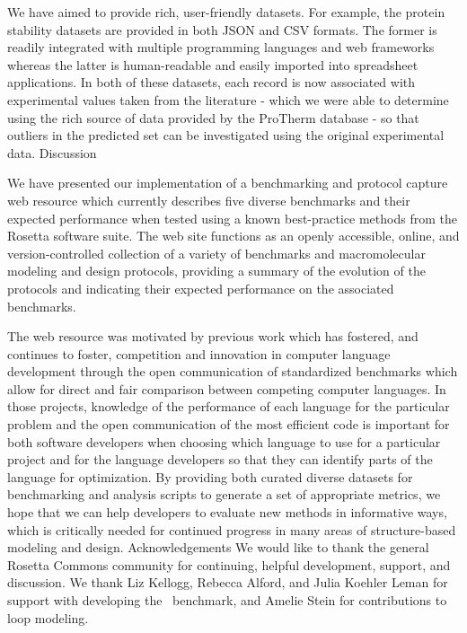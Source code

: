 We have aimed to provide rich, user-friendly datasets. For example, the protein stability datasets are provided in both JSON and CSV formats. The former is readily integrated with multiple programming languages and web frameworks whereas the latter is human-readable and easily imported into spreadsheet applications. In both of these datasets, each record is now associated with experimental values taken from the literature - which we were able to determine using the rich source of data provided by the ProTherm database \cite{kumar_protherm_2006} - so that outliers in the predicted set can be investigated using the original experimental data.
Discussion

We have presented our implementation of a benchmarking and protocol capture web resource which currently describes five diverse benchmarks and their expected performance when tested using a known best-practice methods from the Rosetta software suite. The web site functions as an openly accessible, online, and version-controlled collection of a variety of benchmarks and macromolecular modeling and design protocols, providing a summary of the evolution of the protocols and indicating their expected performance on the associated benchmarks.

The web resource was motivated by previous work \cite{bagley_d_computer_2004,calpini_a_great_2003} which has fostered, and continues to foster, competition and innovation in computer language development through the open communication of standardized benchmarks which allow for direct and fair comparison between competing computer languages. In those projects, knowledge of the performance of each language for the particular problem and the open communication of the most efficient code is important for both software developers when choosing which language to use for a particular project and for the language developers so that they can identify parts of the language for optimization. By providing both curated diverse datasets for benchmarking and analysis scripts to generate a set of appropriate metrics, we hope that we can help developers to evaluate new methods in informative ways, which is critically needed for continued progress in many areas of structure-based modeling and design.
Acknowledgements
We would like to thank the general Rosetta Commons community for continuing, helpful development, support, and discussion. We thank Liz Kellogg, Rebecca Alford, and Julia Koehler Leman for support with developing the \ddg\ benchmark, and Amelie Stein for contributions to loop modeling.